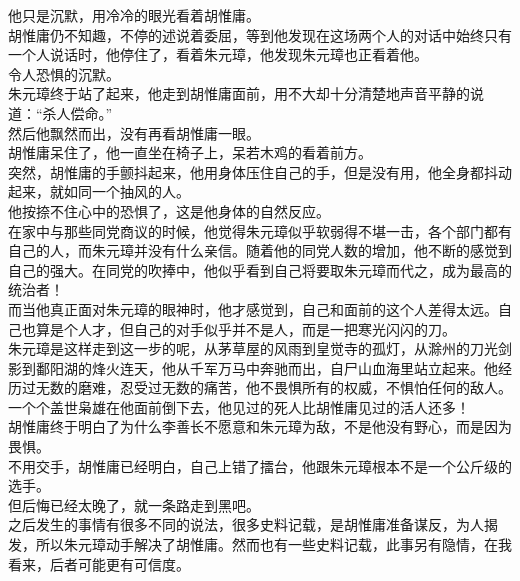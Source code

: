 \begin{multicols}{\theparacolNo}
他只是沉默，用冷冷的眼光看着胡惟庸。\\

胡惟庸仍不知趣，不停的述说着委屈，等到他发现在这场两个人的对话中始终只有一个人说话时，他停住了，看着朱元璋，他发现朱元璋也正看着他。\\

令人恐惧的沉默。\\

朱元璋终于站了起来，他走到胡惟庸面前，用不大却十分清楚地声音平静的说道：“杀人偿命。”\\

然后他飘然而出，没有再看胡惟庸一眼。\\

胡惟庸呆住了，他一直坐在椅子上，呆若木鸡的看着前方。\\

突然，胡惟庸的手颤抖起来，他用身体压住自己的手，但是没有用，他全身都抖动起来，就如同一个抽风的人。\\

他按捺不住心中的恐惧了，这是他身体的自然反应。\\

在家中与那些同党商议的时候，他觉得朱元璋似乎软弱得不堪一击，各个部门都有自己的人，而朱元璋并没有什么亲信。随着他的同党人数的增加，他不断的感觉到自己的强大。在同党的吹捧中，他似乎看到自己将要取朱元璋而代之，成为最高的统治者！\\

而当他真正面对朱元璋的眼神时，他才感觉到，自己和面前的这个人差得太远。自己也算是个人才，但自己的对手似乎并不是人，而是一把寒光闪闪的刀。\\

朱元璋是这样走到这一步的呢，从茅草屋的风雨到皇觉寺的孤灯，从滁州的刀光剑影到鄱阳湖的烽火连天，他从千军万马中奔驰而出，自尸山血海里站立起来。他经历过无数的磨难，忍受过无数的痛苦，他不畏惧所有的权威，不惧怕任何的敌人。一个个盖世枭雄在他面前倒下去，他见过的死人比胡惟庸见过的活人还多！\\

胡惟庸终于明白了为什么李善长不愿意和朱元璋为敌，不是他没有野心，而是因为畏惧。\\

不用交手，胡惟庸已经明白，自己上错了擂台，他跟朱元璋根本不是一个公斤级的选手。\\

但后悔已经太晚了，就一条路走到黑吧。\\

之后发生的事情有很多不同的说法，很多史料记载，是胡惟庸准备谋反，为人揭发，所以朱元璋动手解决了胡惟庸。然而也有一些史料记载，此事另有隐情，在我看来，后者可能更有可信度。\\


\end{multicols}
